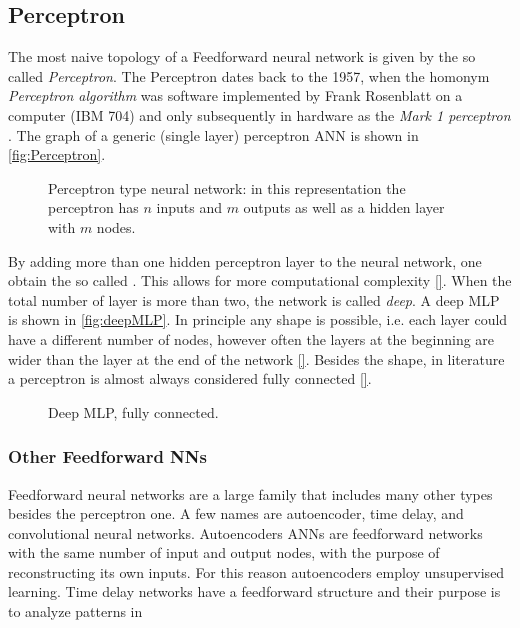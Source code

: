 \subsection{Perceptron}
\label{ssec:Perceptron}

The most naive topology of a Feedforward neural network is given by the so called \textit{Perceptron}.
The Perceptron dates back to the 1957, when the homonym \textit{Perceptron algorithm} was software implemented by Frank Rosenblatt on a computer (IBM 704) and only subsequently in hardware as the \textit{Mark 1 perceptron} \cite{frank1957perceptron,Rosenblatt1958}.
The graph of a generic (single layer) perceptron \acs{ANN} is shown in \autoref{fig:Perceptron}.

\begin{figure}[ht]
	\centering
	
	\caption{%
		Perceptron type neural network: in this representation the perceptron has $n$ inputs and $m$ outputs as well as a hidden layer with $m$ nodes. %
		}
	\label{fig:Perceptron}
\end{figure}

By adding more than one hidden perceptron layer to the neural network, one obtain the so called .
This allows for more computational complexity \ref{}.
When the total number of layer is more than two, the network is called \textit{deep}.
A deep \acs{MLP} is shown in \autoref{fig:deepMLP}.
In principle any shape is possible, i.e. each layer could have a different number of nodes, however often the layers at the beginning are wider than the layer at the end of the network \ref{}.
Besides the shape, in literature a perceptron is almost always considered fully connected \ref{}.

\begin{figure}[ht]
	\centering
	
	\caption{	Deep \acf{MLP}, fully connected.}
	\label{fig:deepMLP}
\end{figure}

\subsubsection{Other Feedforward NNs}
\label{sssec:Other_Feedforward_NNs}

Feedforward neural networks are a large family that includes many other types besides the perceptron one.
A few names are autoencoder, time delay, and convolutional neural networks.
Autoencoders \acsp{ANN} are feedforward networks with the same number of input and output nodes, with the purpose of reconstructing its own inputs.
For this reason autoencoders employ unsupervised learning.
Time delay networks have a feedforward structure and their purpose is to analyze patterns in

